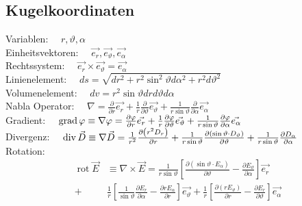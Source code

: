 \subsection{Kugelkoordinaten}
Variablen:          $\quad r, \vartheta, \alpha$\\
Einheitsvektoren:   $\quad \vec{e_{r}}, \vec{e_{\vartheta}}, \vec{e_{\alpha}}$\\
Rechtssystem:       $\quad \vec{e_{r}} \times \vec{e_{\vartheta}}=\vec{e_{\alpha}}$\\
Linienelement:      $\quad d s=\sqrt{d r^{2}+r^{2} \sin ^{2} \vartheta d \alpha^{2}+r^{2} d \vartheta^{2}}$\\
Volumenelement:     $\quad d v=r^{2} \sin \vartheta d r d \vartheta d \alpha$\\
Nabla Operator:     $\quad \nabla=\frac{\partial}{\partial r} \vec{e_{r}}+\frac{1}{r} \frac{\partial}{\partial \vartheta} \vec{e_{\vartheta}}+\frac{1}{r \sin \vartheta} \frac{\partial}{\partial \alpha} \vec{e_{\alpha}}$\\
Gradient:           $\quad \operatorname{grad} \varphi \equiv \nabla \varphi=\frac{\partial \varphi}{\partial r} \vec{e_{r}}+\frac{1}{r} \frac{\partial \varphi}{\partial \vartheta} \vec{e_{\vartheta}}+\frac{1}{r \sin \vartheta} \frac{\partial \varphi}{\partial \alpha} \vec{e_{\alpha}}$\\
Divergenz:          $\quad \operatorname{div} \vec{D} \equiv \nabla \vec{D}=\frac{1}{r^{2}} \frac{\partial\left(r^{2} D_{r}\right)}{\partial r}+\frac{1}{r \sin \vartheta} \frac{\partial\left(\sin \vartheta \cdot D_{\vartheta}\right)}{\partial \vartheta}+\frac{1}{r \sin \vartheta} \frac{\partial D_{\alpha}}{\partial \alpha}$\\
Rotation:           
\begin{align*}
    \operatorname{rot} \vec{E} &\equiv \nabla \times \vec{E}= \frac{1}{r \sin \vartheta}\left[\frac{\partial\left(\sin \vartheta \cdot E_{\alpha}\right)}{\partial \vartheta}-\frac{\partial E_{\vartheta}}{\partial \alpha}\right] \vec{e_{r}}\\
        +&\frac{1}{r}\left[\frac{1}{\sin \vartheta} \frac{\partial E_{r}}{\partial \alpha}-\frac{\partial r E_{\alpha}}{\partial r}\right] \vec{e_{\vartheta}}+\frac{1}{r}\left[\frac{\partial\left(r E_{\vartheta}\right)}{\partial r}-\frac{\partial E_{r}}{\partial \vartheta}\right] \vec{e_{\alpha}}
\end{align*}
